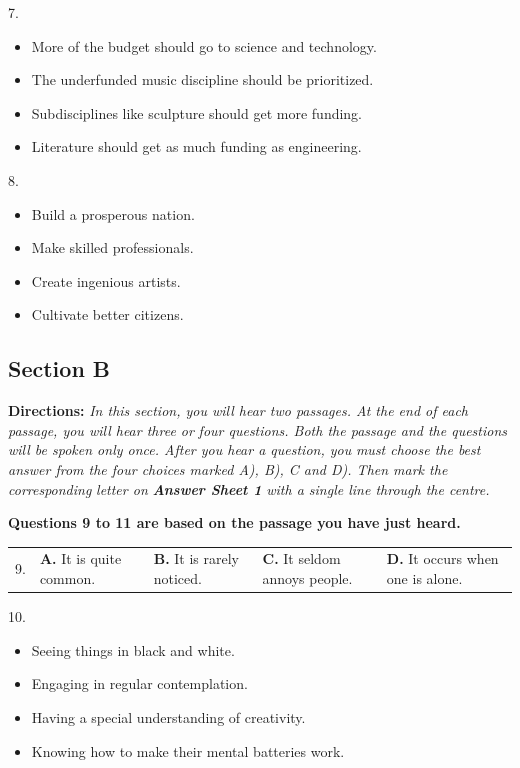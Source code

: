 \documentclass[UTF8,11pt]{ctexart}
\begin{document}
7.


\begin{itemize}[leftmargin=2em,itemsep=.2em,topsep=.4em]\item[A.] More of the budget should go to science and technology.
\item[B.] The underfunded music discipline should be prioritized.
\item[C.] Subdisciplines like sculpture should get more funding.
\item[D.] Literature should get as much funding as engineering.
\end{itemize}

8.


\begin{itemize}[leftmargin=2em,itemsep=.2em,topsep=.4em]\item[A.] Build a prosperous nation.
\item[B.] Make skilled professionals.
\item[C.] Create ingenious artists.
\item[D.] Cultivate better citizens.
\end{itemize}

\subsection*{\textbf{Section B}}


\textbf{Directions:} \textit{In this section, you will hear two passages. At the end of each passage, you will hear three or} \textit{four questions. Both the passage and the questions will be spoken only once. After you hear a question, you} \textit{must choose the best answer from the four choices marked A), B), C and D). Then mark the corresponding} \textit{letter on }\textbf{\textit{Answer Sheet 1}}\textit{ with a single line through the centre.}


\textbf{Questions 9 to 11 are based on the passage you have just heard.}


\noindent\begin{tabularx}{\linewidth}{@{}lXXXX@{}}9. & \textbf{A.} It is quite common. & \textbf{B.} It is rarely noticed. & \textbf{C.} It seldom annoys people. & \textbf{D.} It occurs when one is alone.\\\end{tabularx}\par

10.


\begin{itemize}[leftmargin=2em,itemsep=.2em,topsep=.4em]\item[A.] Seeing things in black and white.
\item[B.] Engaging in regular contemplation.
\item[C.] Having a special understanding of creativity.
\item[D.] Knowing how to make their mental batteries work.
\end{itemize}
\end{document}
